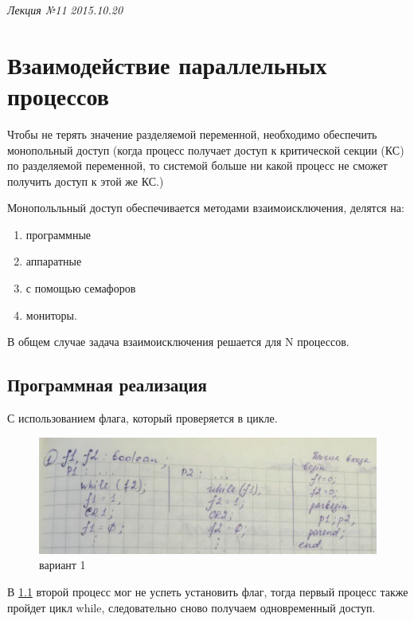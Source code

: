 \clearpage
\begin{flushright}
	\textit{Лекция №11}
	\textit{2015.10.20}
\end{flushright}

\chapter{Взаимодействие параллельных процессов}

Чтобы не терять значение разделяемой переменной, необходимо обеспечить монопольный доступ (когда процесс получает доступ к критической секции (КС) по разделяемой переменной, то системой больше ни какой процесс не сможет получить доступ к этой же КС.) 

Монопольльный доступ обеспечивается методами взаимоисключения, делятся на:
\begin{enumerate}
    \item программные
    \item аппаратные
    \item с помощью семафоров
    \item мониторы.
\end{enumerate} 

В общем случае задача взаимоисключения решается для N процессов.

\section{Программная реализация}

С использованием флага, который проверяется в цикле.

\begin{figure}[H]
    \centering
    \includegraphics[width=\textwidth]{listing/1.png}
    \caption{вариант 1}
    \label{listing:prog_flag}
\end{figure}

В \ref{listing:prog_flag} второй процесс мог не успеть установить флаг, тогда первый процесс также пройдет цикл while, следовательно сново получаем одновременный доступ.

